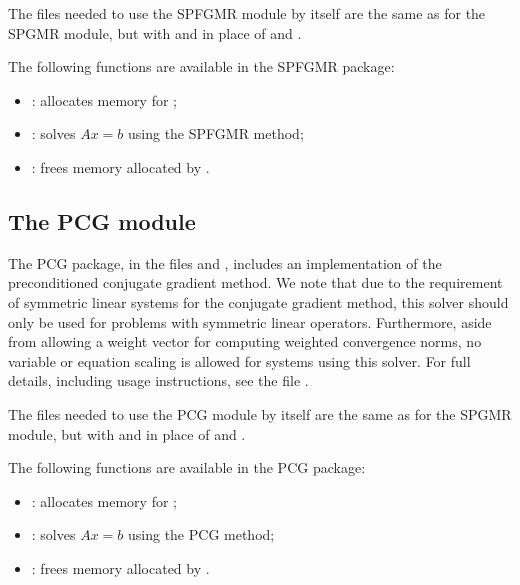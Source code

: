 \documentclass[letterpaper,10pt,english]{sphinxmanual}
\begin{document}
The files needed to use the SPFGMR module by itself are the same as for
the SPGMR module, but with  and
 in place of  and
.

The following functions are available in the SPFGMR package:
\begin{itemize}
\item {} 
: allocates memory for ;

\item {} 
: solves $Ax = b$ using the SPFGMR method;

\item {} 
: frees memory allocated by .

\end{itemize}


\subsection{The PCG module}
\label{linear_solvers/SPILS:the-pcg-module}
The PCG package, in the files  and
, includes an implementation of the
preconditioned conjugate gradient method.  We note that due to the
requirement of symmetric linear systems for the conjugate gradient
method, this solver should only be used for problems with symmetric
linear operators.  Furthermore, aside from allowing a weight vector
for computing weighted convergence norms, no variable or equation
scaling is allowed for systems using this solver.  For full details,
including usage instructions, see the file .

The files needed to use the PCG module by itself are the same as for
the SPGMR module, but with  and
 in place of  and
.

The following functions are available in the PCG package:
\begin{itemize}
\item {} 
: allocates memory for ;

\item {} 
: solves $Ax = b$ using the PCG method;

\item {} 
: frees memory allocated by .

\end{itemize}
\end{document}
